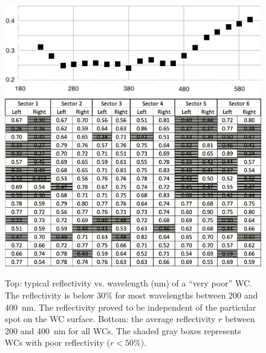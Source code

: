 \begin{figure}
	\centering
	\includegraphics[width=0.98\columnwidth,keepaspectratio]{img/winstoConeSample2Reflectivity.png}
	\includegraphics[width=0.98\columnwidth,keepaspectratio]{img/wcStatusBefore.png}
	\caption{Top: typical reflectivity vs. wavelength (nm) of a ``very poor'' WC. The reflectivity is below 30\% for
          most wavelengths between 200 and 400~nm. The reflectivity proved to be independent of the particular spot
          on the WC surface. Bottom: the average reflectivity $r$ between 200 and 400~nm for all WCs. The shaded
          gray boxes represents WCs with poor reflectivity ($r < 50$\%).}
	\label{fig:wcStatusBefore}
\end{figure}

